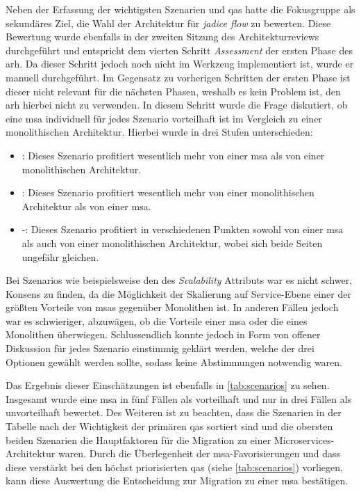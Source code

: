 Neben der Erfassung der wichtigsten Szenarien und \glspl{qa} hatte die Fokusgruppe als sekundäres Ziel, die Wahl der Architektur für \emph{jadice flow} zu bewerten.
Diese Bewertung wurde ebenfalls in der zweiten Sitzung des Architekturreviews durchgeführt und entspricht dem vierten Schritt \emph{Assessment} der ersten Phase des \gls{arh}.
Da dieser Schritt jedoch noch nicht im Werkzeug implementiert ist, wurde er manuell durchgeführt.
Im Gegensatz zu vorherigen Schritten der ersten Phase ist dieser nicht relevant für die nächsten Phasen, weshalb es kein Problem ist, den \gls{arh} hierbei nicht zu verwenden.
In diesem Schritt wurde die Frage diskutiert, ob eine \acrlong{msa} individuell für jedes Szenario vorteilhaft ist im Vergleich zu einer monolithischen Architektur.
Hierbei wurde in drei Stufen unterschieden:
\begin{itemize}
	\item \advantage\hspace*{0.1cm}: Dieses Szenario profitiert wesentlich mehr von einer \gls{msa} als von einer monolithischen Architektur.
	\item \disadvantage\hspace*{0.1cm}: Dieses Szenario profitiert wesentlich mehr von einer monolithischen Architektur als von einer \gls{msa}.
	\item \hspace*{0.27cm}-\hspace*{0.27cm}: Dieses Szenario profitiert in verschiedenen Punkten sowohl von einer \gls{msa} als auch von einer monolithischen Architektur, wobei sich beide Seiten ungefähr gleichen.
\end{itemize}
Bei Szenarios wie beispielsweise den des \emph{Scalability} Attributs war es nicht schwer, Konsens zu finden, da die Möglichkeit der Skalierung auf Service-Ebene einer der größten Vorteile von \glspl{msa} gegenüber Monolithen ist.
In anderen Fällen jedoch war es schwieriger, abzuwägen, ob die Vorteile einer \gls{msa} oder die eines Monolithen überwiegen.
Schlussendlich konnte jedoch in Form von offener  Diskussion für jedes Szenario einstimmig geklärt werden, welche der drei Optionen gewählt werden sollte, sodass keine Abstimmungen notwendig waren.

Das Ergebnis dieser Einschätzungen ist ebenfalls in \cref{tab:scenarios} zu sehen.
Insgesamt wurde eine \gls{msa} in fünf Fällen als vorteilhaft und nur in drei Fällen als unvorteilhaft bewertet.
Des Weiteren ist zu beachten, dass die Szenarien in der Tabelle nach der Wichtigkeit der primären \glspl{qa} sortiert sind und die obersten beiden Szenarien die Hauptfaktoren für die Migration zu einer Microservices-Architektur waren.
Durch die Überlegenheit der \gls{msa}-Favorisierungen und dass diese verstärkt bei den höchst priorisierten \glspl{qa} (siehe \cref{tab:scenarios}) vorliegen, kann diese Auswertung die Entscheidung zur Migration zu einer \gls{msa} bestätigen.

